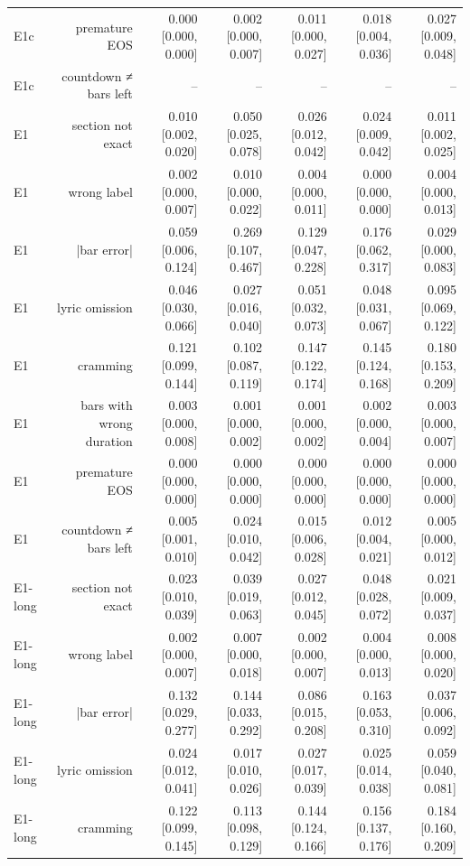 \begin{table}[t]
\begin{tabular}{lrrrrrr}
E1c & premature EOS & 0.000 [0.000, 0.000] & 0.002 [0.000, 0.007] & 0.011 [0.000, 0.027] & 0.018 [0.004, 0.036] & 0.027 [0.009, 0.048] \\
E1c & countdown ≠ bars left & – & – & – & – & – \\
E1 & section not exact & 0.010 [0.002, 0.020] & 0.050 [0.025, 0.078] & 0.026 [0.012, 0.042] & 0.024 [0.009, 0.042] & 0.011 [0.002, 0.025] \\
E1 & wrong label & 0.002 [0.000, 0.007] & 0.010 [0.000, 0.022] & 0.004 [0.000, 0.011] & 0.000 [0.000, 0.000] & 0.004 [0.000, 0.013] \\
E1 & |bar error| & 0.059 [0.006, 0.124] & 0.269 [0.107, 0.467] & 0.129 [0.047, 0.228] & 0.176 [0.062, 0.317] & 0.029 [0.000, 0.083] \\
E1 & lyric omission & 0.046 [0.030, 0.066] & 0.027 [0.016, 0.040] & 0.051 [0.032, 0.073] & 0.048 [0.031, 0.067] & 0.095 [0.069, 0.122] \\
E1 & cramming & 0.121 [0.099, 0.144] & 0.102 [0.087, 0.119] & 0.147 [0.122, 0.174] & 0.145 [0.124, 0.168] & 0.180 [0.153, 0.209] \\
E1 & bars with wrong duration & 0.003 [0.000, 0.008] & 0.001 [0.000, 0.002] & 0.001 [0.000, 0.002] & 0.002 [0.000, 0.004] & 0.003 [0.000, 0.007] \\
E1 & premature EOS & 0.000 [0.000, 0.000] & 0.000 [0.000, 0.000] & 0.000 [0.000, 0.000] & 0.000 [0.000, 0.000] & 0.000 [0.000, 0.000] \\
E1 & countdown ≠ bars left & 0.005 [0.001, 0.010] & 0.024 [0.010, 0.042] & 0.015 [0.006, 0.028] & 0.012 [0.004, 0.021] & 0.005 [0.000, 0.012] \\
E1-long & section not exact & 0.023 [0.010, 0.039] & 0.039 [0.019, 0.063] & 0.027 [0.012, 0.045] & 0.048 [0.028, 0.072] & 0.021 [0.009, 0.037] \\
E1-long & wrong label & 0.002 [0.000, 0.007] & 0.007 [0.000, 0.018] & 0.002 [0.000, 0.007] & 0.004 [0.000, 0.013] & 0.008 [0.000, 0.020] \\
E1-long & |bar error| & 0.132 [0.029, 0.277] & 0.144 [0.033, 0.292] & 0.086 [0.015, 0.208] & 0.163 [0.053, 0.310] & 0.037 [0.006, 0.092] \\
E1-long & lyric omission & 0.024 [0.012, 0.041] & 0.017 [0.010, 0.026] & 0.027 [0.017, 0.039] & 0.025 [0.014, 0.038] & 0.059 [0.040, 0.081] \\
E1-long & cramming & 0.122 [0.099, 0.145] & 0.113 [0.098, 0.129] & 0.144 [0.124, 0.166] & 0.156 [0.137, 0.176] & 0.184 [0.160, 0.209] \\

\end{tabular}
\end{table}
